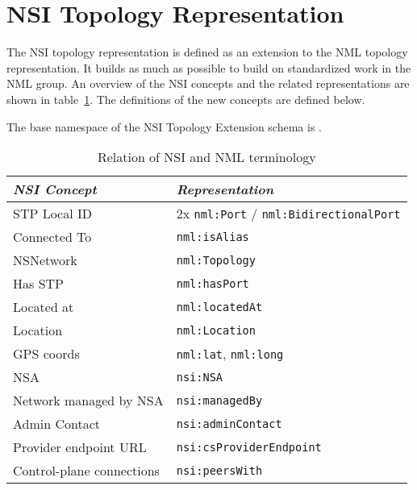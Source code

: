 \documentclass[12pt]{article}  %
\begin{document}
\section{NSI Topology Representation} %
\label{sub:nsi_topology_representation}

 The NSI topology representation is defined as an extension to the NML topology 
representation. It builds as much as possible to build on standardized work in the NML group.
An overview of the NSI concepts and the related representations are shown in table~\ref{tab:nsi-nml}.
The definitions of the new concepts are defined below.

The base namespace of the NSI Topology Extension schema is .

\begin{table}
\begin{center}

  \begin{tabular}{|l|l|}
\hline
     \textit{NSI Concept} &                               \textit{Representation}\\
\hline
             STP Local ID & 2x \texttt{nml:Port} / \texttt{nml:BidirectionalPort}\\
\hline
             Connected To &                                  \texttt{nml:isAlias}\\
\hline
                NSNetwork &                                 \texttt{nml:Topology}\\
\hline
                  Has STP &                                  \texttt{nml:hasPort}\\
\hline
               Located at &                                \texttt{nml:locatedAt}\\
\hline
                 Location &                                 \texttt{nml:Location}\\
\hline
               GPS coords &                   \texttt{nml:lat}, \texttt{nml:long}\\
\hline
                      NSA &                                      \texttt{nsi:NSA}\\
\hline
   Network managed by NSA &                                \texttt{nsi:managedBy}\\
\hline
            Admin Contact &                             \texttt{nsi:adminContact}\\
\hline
    Provider endpoint URL &                       \texttt{nsi:csProviderEndpoint}\\
\hline
Control-plane connections &                                \texttt{nsi:peersWith}\\
\hline
\end{tabular}
\caption{Relation of NSI and NML terminology}\label{tab:nsi-nml}
  \end{center}
\end{table}
\end{document}
